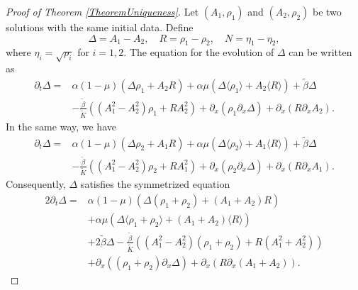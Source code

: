 \documentclass[12pt]{amsart}
\begin{document}
	\begin{proof}[Proof of Theorem \ref{TheoremUniqueness}]
	Let $(A_1,\rho_1)$ and $(A_2,\rho_2)$ be two solutions with the same initial data. Define
\[
\Delta = A_1 - A_2,\quad R = \rho_1 - \rho_2,\quad N = \eta_1 - \eta_2,
\]
where $\eta_i = \sqrt{\rho_i}$ for $i=1,2$.
	The equation for the evolution of $\Delta$ can be written as 
	\begin{equation*}
		\begin{split}
			\partial_t \Delta=&\alpha(1-\mu)(\Delta\rho_1+A_2R)+\alpha\mu(\Delta\langle \rho_1 \rangle+ A_2\langle R \rangle)+ \widetilde{\beta}\Delta\\
            &-\frac{\widetilde{\beta}}{\widetilde{K}}((A_1^2 -A_2^2)\rho_1+RA_2^2)+\partial_x(\rho_1\partial_x \Delta)+\partial_x(R\partial_x A_2).
		\end{split}
	\end{equation*}
	In the  same way, we  have
	\begin{equation*}
		\begin{split}
			\partial_t \Delta=&\alpha(1-\mu)(\Delta\rho_2+A_1R)+\alpha\mu(\Delta\langle \rho_2 \rangle+ A_1\langle R \rangle)+ \widetilde{\beta}\Delta\\&-\frac{\widetilde{\beta}}{\widetilde{K}}((A_1^2 -A_2^2)\rho_2+RA_1^2)
			+\partial_x(\rho_2\partial_x \Delta)+\partial_x(R\partial_x A_1).
		\end{split}
	\end{equation*}
	Consequently, $\Delta$ satisfies the symmetrized equation 
	\begin{equation}\label{EquationDelta}
		\begin{split}
			2\partial_t \Delta=&\alpha(1-\mu)(\Delta(\rho_1+\rho_2)+(A_1+A_2)R)\\
            &+\alpha\mu(\Delta\langle \rho_1+\rho_2 \rangle+ (A_1+A_2)\langle R \rangle)\\
			&+ 2\widetilde{\beta}\Delta-\frac{\widetilde{\beta}}{\widetilde{K}}((A_1^2 -A_2^2)(\rho_1+\rho_2)+R(A_1^2+A_2^2))\\
			&+\partial_x((\rho_1+\rho_2)\partial_x \Delta)+\partial_x(R\partial_x (A_1+A_2)).
		\end{split}
	\end{equation}
	

\end{proof}
\end{document}
